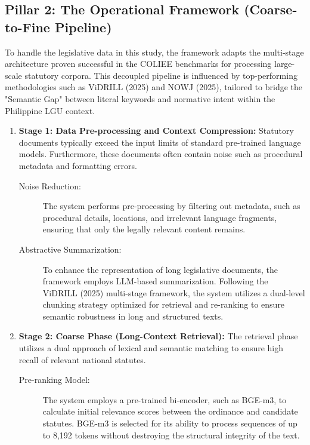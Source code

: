 \subsection{Pillar 2: The Operational Framework (Coarse-to-Fine Pipeline)}
To handle the legislative data in this study, the framework adapts the multi-stage architecture proven successful in the COLIEE benchmarks for processing large-scale statutory corpora. This decoupled pipeline is influenced by top-performing methodologies such as ViDRILL (2025) and NOWJ (2025), tailored to bridge the "Semantic Gap" between literal keywords and normative intent within the Philippine LGU context.

\begin{enumerate}
    \item \textbf{Stage 1: Data Pre-processing and Context Compression:} Statutory documents typically exceed the input limits of standard pre-trained language models. Furthermore, these documents often contain noise such as procedural metadata and formatting errors.
    \begin{description}
            \item[Noise Reduction:] The system performs pre-processing by filtering out metadata, such as procedural details, locations, and irrelevant language fragments, ensuring that only the legally relevant content remains.

            \item[Abstractive Summarization:] To enhance the representation of long legislative documents, the framework employs LLM-based summarization. Following the ViDRILL (2025) multi-stage framework, the system utilizes a dual-level chunking strategy optimized for retrieval and re-ranking to ensure semantic robustness in long and structured texts. \cite{goebeletal2026coliee2025}
    \end{description}
    
    \item \textbf{Stage 2: Coarse Phase (Long-Context Retrieval):} The retrieval phase utilizes a dual approach of lexical and semantic matching to ensure high recall of relevant national statutes.
    \begin{description}
        \item[Pre-ranking Model:] The system employs a pre-trained bi-encoder, such as BGE-m3, to calculate initial relevance scores between the ordinance and candidate statutes. BGE-m3 is selected for its ability to process sequences of up to 8,192 tokens without destroying the structural integrity of the text.


\end{description}
\end{enumerate}
